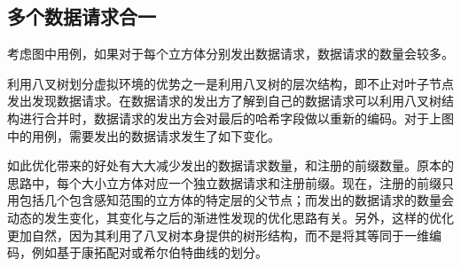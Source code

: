 \subsection{多个数据请求合一}
\label{MultiLevelOptimizationSection}
\par
考虑图中用例，如果对于每个立方体分别发出数据请求，数据请求的数量会较多。
\par
利用八叉树划分虚拟环境的优势之一是利用八叉树的层次结构，即不止对叶子节点发出发现数据请求。在数据请求的发出方了解到自己的数据请求可以利用八叉树结构进行合并时，数据请求的发出方会对最后的哈希字段做以重新的编码。对于上图中的用例，需要发出的数据请求发生了如下变化。
\par
如此优化带来的好处有大大减少发出的数据请求数量，和注册的前缀数量。原本的思路中，每个大小立方体对应一个独立数据请求和注册前缀。现在，注册的前缀只用包括几个包含感知范围的立方体的特定层的父节点；而发出的数据请求的数量会动态的发生变化，其变化与之后的渐进性发现的优化思路有关。另外，这样的优化更加自然，因为其利用了八叉树本身提供的树形结构，而不是将其等同于一维编码，例如基于康拓配对或希尔伯特曲线的划分。
\par
